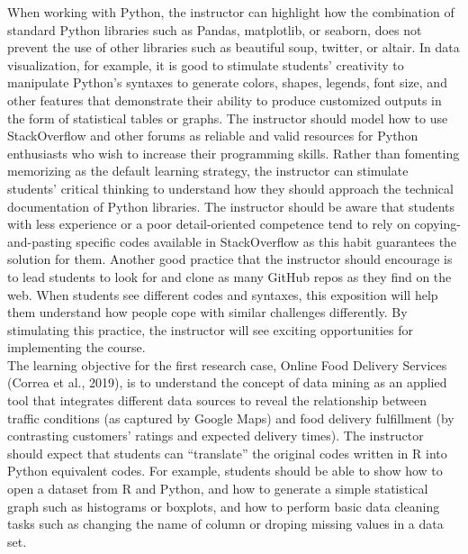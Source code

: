 \documentclass[letterpaper,11pt]{article}
\begin{document}
When working with Python, the instructor can highlight how the combination of standard Python libraries such as Pandas, matplotlib, or seaborn, does not prevent the use of other libraries such as beautiful soup, twitter, or altair. In data visualization, for example, it is good to stimulate students' creativity to manipulate Python's syntaxes to generate colors, shapes, legends, font size, and other features that demonstrate their ability to produce customized outputs in the form of statistical tables or graphs. The instructor should model how to use StackOverflow and other forums as reliable and valid resources for Python enthusiasts who wish to increase their programming skills. Rather than fomenting memorizing as the default learning strategy, the instructor can stimulate students' critical thinking to understand how they should approach the technical documentation of Python libraries. The instructor should be aware that students with less experience or a poor detail-oriented competence tend to rely on copying-and-pasting specific codes available in StackOverflow as this habit guarantees the solution for them. Another good practice that the instructor should encourage is to lead students to look for and clone as many GitHub repos as they find on the web. When students see different codes and syntaxes, this exposition will help them understand how people cope with similar challenges differently. By stimulating this practice, the instructor will see exciting opportunities for implementing the course.\\
\vspace{0.3cm}
The learning objective for the first research case, Online Food Delivery Services (Correa et al., 2019), is to understand the concept of data mining as an applied tool that integrates different data sources to reveal the relationship between traffic conditions (as captured by Google Maps) and food delivery fulfillment (by contrasting customers' ratings and expected delivery times). The instructor should expect that students can ``translate'' the original codes written in R into Python equivalent codes. For example, students should be able to show how to open a dataset from R and Python, and how to generate a simple statistical graph such as histograms or boxplots, and how to perform basic data cleaning tasks such as changing the name of column or droping missing values in a data set. \\
\vspace{0.3cm}
\end{document}
